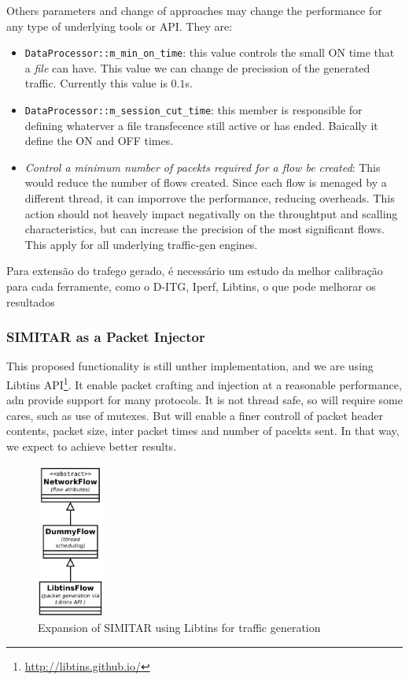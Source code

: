 Others parameters and change of approaches may change the performance for any type of underlying tools or API. They are:

\begin{itemize}

	\item \texttt{DataProcessor::m\_min\_on\_time}: this value controls the small ON time that a \textit{file} can have. This value we can change de precission of the generated traffic. Currently this value is $0.1$s. 
	
	\item \texttt{DataProcessor::m\_session\_cut\_time}:  this member is responsible for defining whaterver a file transfecence still active or has ended. Baically it define the ON and OFF times. 
	
	\item \textit{Control a minimum number of pacekts required for a flow be created}: This would reduce the number of flows created. Since each flow is menaged by a different thread, it can imporrove the performance, reducing overheads. This action should not heavely impact negativally on the throughtput and scalling characteristics, but can increase the precision of the most significant flows. This apply for all underlying traffic-gen engines.
	
	
\end{itemize}



Para extensão do trafego gerado, é necessário um estudo da melhor calibração para cada ferramente, como o D-ITG, Iperf, Libtins, o que pode melhorar os resultados

\subsubsection{SIMITAR as a Packet Injector}

This proposed functionality is still unther implementation, and we are using Libtins API\footnote{\href{http://libtins.github.io/}{http://libtins.github.io/}}. It enable packet crafting and injection at a reasonable performance, adn provide support for many protocols. It is not thread safe, so will require some cares, such as use of mutexes. But will enable a finer controll of packet header contents, packet size, inter packet times and number of pacekts sent. In that way, we expect to achieve better results.  



\begin{figure}[!ht]
	\centering
	\includegraphics[height=2.0in]{figures/ch6/libtins-flow}
	\caption{Expansion of SIMITAR using Libtins for traffic generation}
	\label{fig:libtins-flow}
\end{figure}

